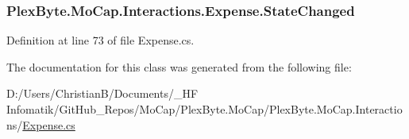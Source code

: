 \subsubsection[{\texorpdfstring{State\+Changed}{StateChanged}}]{ Plex\+Byte.\+Mo\+Cap.\+Interactions.\+Expense.\+State\+Changed}\hypertarget{class_plex_byte_1_1_mo_cap_1_1_interactions_1_1_expense_a7679bcdaa6ea38ebace9d9ed2013a16a}{}\label{class_plex_byte_1_1_mo_cap_1_1_interactions_1_1_expense_a7679bcdaa6ea38ebace9d9ed2013a16a}


Definition at line 73 of file Expense.\+cs.



The documentation for this class was generated from the following file\+:\begin{DoxyCompactItemize}
\item 
D\+:/\+Users/\+Christian\+B/\+Documents/\+\_\+\+H\+F Infomatik/\+Git\+Hub\+\_\+\+Repos/\+Mo\+Cap/\+Plex\+Byte.\+Mo\+Cap/\+Plex\+Byte.\+Mo\+Cap.\+Interactions/\hyperlink{_expense_8cs}{Expense.\+cs}\end{DoxyCompactItemize}
